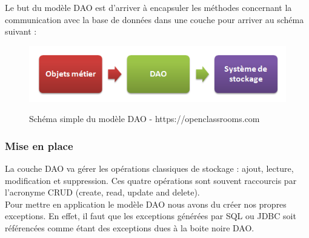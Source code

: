 Le but du modèle DAO est d'arriver à encapsuler les méthodes concernant la communication avec la base de données dans une couche pour arriver au schéma suivant :

\begin{figure}[H]
  \center
  \includegraphics[scale=0.5]{../graph/dao1.png} \\
  \caption{Schéma simple du modèle DAO - https://openclassrooms.com}
\end{figure}

\subsubsection{Mise en place}
La couche DAO va gérer les opérations classiques de stockage : ajout, lecture, modification et suppression. Ces quatre opérations sont souvent raccourcis par l'acronyme CRUD (create, read, update and delete). \\

Pour mettre en application le modèle DAO nous avons du créer nos propres exceptions. En effet, il faut que les exceptions générées par SQL ou JDBC soit référencées comme étant des exceptions dues à la boite noire DAO. 

